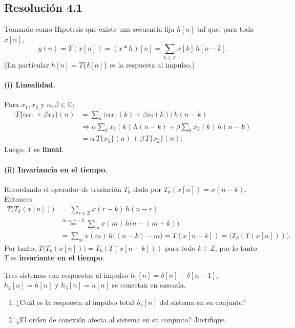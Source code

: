 \documentclass[
  11pt,
  letterpaper,
   addpoints,
  ]{exam}
\begin{document}
\begin{questions}
\begin{solution}
\subsection*{Resolución 4.1}
  Tomando como Hipotesis que existe una secuencia fija $h[n]$ tal que, para toda $x[n]$,
  \begin{equation}
y(n) = T(x[n])= (x*h)[n] =\sum_{k\in\mathbb Z} x[k]\,h[n-k].
\end{equation}
(En particular $h[n]=T\{\delta[n]\}$ es la respuesta al impulso.)

\paragraph{(i) Linealidad.}
Para $x_1,x_2$ y $\alpha,\beta\in\mathbb C$:
\begin{align}
T\{\alpha x_1+\beta x_2\}(n)
&= \sum_{k} \big(\alpha x_1(k)+\beta x_2(k)\big)\,h(n-k) \nonumber\\
&\Rightarrow \alpha \sum_{k} x_1(k)\,h(n-k)+\beta \sum_{k} x_2(k)\,h(n-k) \nonumber\\
&= \alpha\,T\{x_1\}(n)+\beta\,T\{x_2\}(n).
\end{align}
Luego, $T$ es \textbf{lineal}.

\paragraph{(ii) Invariancia en el tiempo.}
Recordando el operador de traslación $T_k$ dado por $T_k(x[n])=x(n-k)$. Entonces
\begin{align}
T\big(T_k(x[n])\big)
&= \sum_{r \in \mathbb{Z}} x(r-k)\,h(n-r) \nonumber\\
&\overset{m=r-k}{=} \sum_{m} x(m)\,h\big(n-(m+k)\big) \nonumber\\
&= \sum_{m} x(m)\,h\big((n-k)-m\big)
 = T(x[n-k]) = \big(T_k(T(x[n]))\big).
\end{align}
Por tanto, $T\big(T_k(x[n])\big)=T_k(T(x[n-k]))$ para todo $k\in\mathbb Z$, por lo tanto $T$ es \textbf{invariante en el tiempo}.

\end{solution}

\question Tres sistemas con respuestas al impulso \(h_1[n]=\delta[n]-\delta[n-1]\), \(h_2[n]=h[n]\) y \(h_3[n]=u[n]\) se conectan en cascada.
\begin{enumerate}
  \item ¿Cuál es la respuesta al impulso total \(h_c[n]\) del sistema en su conjunto?
  \item ¿El orden de conexión afecta al sistema en su conjunto? Justifique.
\end{enumerate}
\begin{solution}

\end{solution}
\end{questions}
\end{document}
